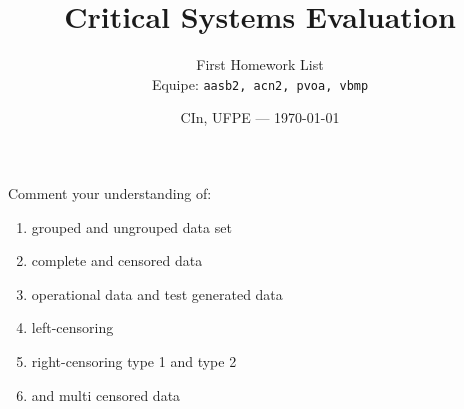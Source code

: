 \documentclass{article}
\title{Critical Systems Evaluation} %
\author{First Homework List\\ Equipe: \texttt{aasb2, acn2, pvoa, vbmp}} %
\date{CIn, UFPE --- \today} %
\begin{document}
\maketitle %

\begin{question}
    Comment your understanding of:
    \begin{enumerate}[label=(\alph*)]
        \item grouped and ungrouped data set
        \item complete and censored data
        \item  operational data and test generated data
        \item left-censoring
        \item right-censoring type 1 and type 2
        \item and multi censored data
    \end{enumerate}
    \end{question}
\end{document}

